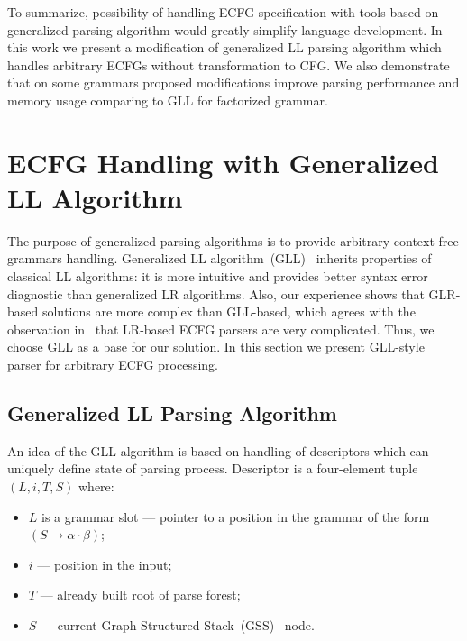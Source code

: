 \documentclass[runningheads,a4paper]{llncs}
\begin{document}
To summarize, possibility of handling ECFG specification with tools based on generalized parsing algorithm would greatly simplify language development.
In this work we present a modification of generalized LL parsing algorithm which handles arbitrary ECFGs without transformation to CFG.
We also demonstrate that on some grammars proposed modifications improve parsing performance and memory usage comparing to GLL for factorized grammar.

\section{ECFG Handling with Generalized LL Algorithm}%

The purpose of generalized parsing algorithms is to provide arbitrary context-free grammars handling.
Generalized LL algorithm~(GLL)~\cite{scott2010gll} inherits properties of classical LL algorithms: it is more intuitive and provides better syntax error diagnostic than generalized LR algorithms.
Also, our experience shows that GLR-based solutions are more complex than GLL-based, which agrees with the observation in~\cite{ECFG} that LR-based ECFG parsers are very complicated. 
Thus, we choose GLL as a base for our solution.
In this section we present GLL-style parser for arbitrary ECFG processing.

\subsection{Generalized LL Parsing Algorithm}%

An idea of the GLL algorithm is based on handling of descriptors which can uniquely define state of parsing process.
Descriptor is a four-element tuple $(L, i, T, S)$ where: 
\begin{itemize}
\item $L$ is a grammar slot --- pointer to a position in the grammar of the form~$(S \to \alpha \cdot \beta)$;
\item $i$ --- position in the input;
\item $T$ --- already built root of parse forest;
\item $S$ --- current Graph Structured Stack~(GSS)~\cite{afroozeh2015faster} node.
\end{itemize}
\end{document}
